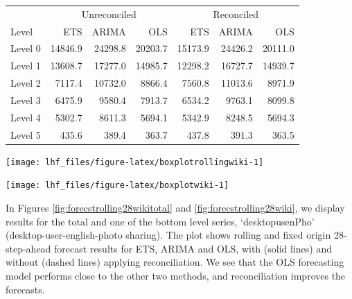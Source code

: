 \documentclass[11pt,a4paper,]{article}
\let\origfigure\figure
\let\endorigfigure\endfigure
\renewenvironment{figure}[1][2] {
    \expandafter\origfigure\expandafter[!htbp]
} {
    \endorigfigure
}
\let\origtable\table
\let\endorigtable\endtable
\renewenvironment{table}[1][2] {
    \expandafter\origtable\expandafter[!htbp]
} {
    \endorigtable
}
\begin{document}
\begin{table}[t]

\caption{\label{tab:wikipediadataresultRMSE}Mean(RMSE) for ETS, ARIMA and OLS with and without reconciliation - Fixed origin 28-step-ahead - Wikipedia dataset}
\centering
\begin{tabular}{lrrrrrr}
\toprule
\multicolumn{1}{c}{} & \multicolumn{3}{c}{Unreconciled} & \multicolumn{3}{c}{Reconciled} \\
\cmidrule(l{2pt}r{2pt}){2-4} \cmidrule(l{2pt}r{2pt}){5-7}
Level & ETS & ARIMA & OLS & ETS & ARIMA & OLS\\
\midrule
Level 0 & 14846.9 & 24298.8 & 20203.7 & 15173.9 & 24426.2 & 20111.0\\
Level 1 & 13608.7 & 17277.0 & 14985.7 & 12298.2 & 16727.7 & 14939.7\\
Level 2 & 7117.4 & 10732.0 & 8866.4 & 7560.8 & 11013.6 & 8971.9\\
Level 3 & 6475.9 & 9580.4 & 7913.7 & 6534.2 & 9763.1 & 8099.8\\
Level 4 & 5302.7 & 8611.3 & 5694.1 & 5342.9 & 8248.5 & 5694.3\\
Level 5 & 435.6 & 389.4 & 363.7 & 437.8 & 391.3 & 363.5\\
\bottomrule
\end{tabular}
\end{table}

\begin{figure}

{\centering \texttt{[image: lhf\_files/figure-latex/boxplotrollingwiki-1]} 

}

\caption{Box plots of forecast errors for reconciled and unreconciled ETS, ARIMA and OLS methods at each hierarchical level for rolling origin 28-step-ahead Wikipedia pageviews.}\label{fig:boxplotrollingwiki}
\end{figure}

\begin{figure}

{\centering \texttt{[image: lhf\_files/figure-latex/boxplotwiki-1]} 

}

\caption{Box plots of forecast errors for reconciled and unreconciled ETS, ARIMA and OLS methods at each hierarchical level for fixed origin 28-step-ahead Wikipedia pageviews.}\label{fig:boxplotwiki}
\end{figure}

In Figures \ref{fig:forecstrolling28wikitotal} and
\ref{fig:forecstrolling28wiki}, we display results for the total and one
of the bottom level series, `desktopusenPho' (desktop-user-english-photo
sharing). The plot shows rolling and fixed origin 28-step-ahead forecast
results for ETS, ARIMA and OLS, with (solid lines) and without (dashed
lines) applying reconciliation. We see that the OLS forecasting model
performs close to the other two methods, and reconciliation improves the
forecasts.
\end{document}
